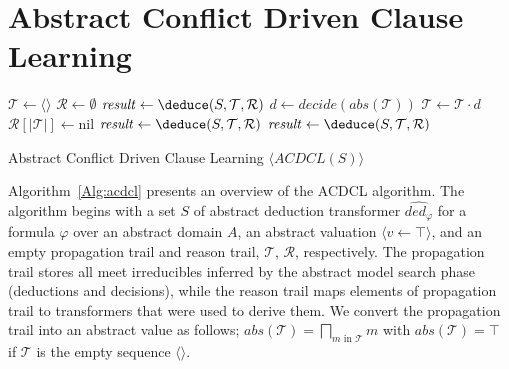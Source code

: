 \section{Abstract Conflict Driven Clause Learning}
%
\begin{algorithm2e}[t]
\DontPrintSemicolon
{}
\begin{small}
$\mathcal{T} \leftarrow \langle\rangle$ \;
$\mathcal{R} \leftarrow \emptyset$ \;
$\mathit{result} \leftarrow \deduce(S,\mathcal{T},\mathcal{R})$ \;
 {
  \return \safe}
{
 {
  \return \unsafe}
  $d \leftarrow decide(\mathit{abs}(\mathcal{T}))$ \;
  $\mathcal{T} \leftarrow \mathcal{T} \cdot d$ \; 
  $\mathcal{R}[|\mathcal{T}|] \leftarrow $\textsf{nil} \;
  $\mathit{result} \leftarrow \deduce(S,\mathcal{T},\mathcal{R})$\;
   {
     {
      \return \safe
    }
    $\mathit{result} \leftarrow \deduce(S,\mathcal{T},\mathcal{R})$ \;
  }
}
\end{small}
\caption{Abstract Conflict Driven Clause Learning $\langle ACDCL(S) \rangle$ \label{Alg:acdcl}}
\end{algorithm2e}
%
Algorithm~\ref{Alg:acdcl} presents an overview of the ACDCL algorithm.
The algorithm begins with a set $S$ of abstract deduction transformer 
$\widehat{ded_{\varphi}}$  for a formula $\varphi$ over an abstract 
domain $A$, an abstract valuation $\langle v \leftarrow \top \rangle$, 
and an empty propagation trail and reason trail, $\mathcal{T}$, $\mathcal{R}$, 
respectively.  The propagation trail stores all meet irreducibles inferred 
by the abstract model search phase (deductions and decisions), while the 
reason trail maps elements of propagation trail to transformers that were 
used to derive them. We convert the propagation trail into an abstract value as follows; $\mathit{abs}(\mathcal{T})=\bigsqcap_{m\text{ in }\mathcal{T}}m$ with $\mathit{abs}(\mathcal{T})=\top$ if $\mathcal{T}$ is the empty sequence $\langle\rangle$.

